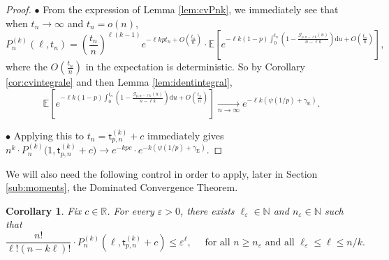 \documentclass[a4, 11pt]{article}
\numberwithin{equation}{section}
\theoremstyle{plain}
\newtheorem{corollary}[theorem]{Corollary}
\theoremstyle{definition}
\theoremstyle{remark}
\begin{document}
\begin{proof} $\bullet$ From the expression of Lemma \ref{lem:cvPnk}, we immediately see that when $t_n \rightarrow \infty$ and $t_n=o(n)$,
$$
P^{(k)}_n(\ell,t_n)=\left( \frac{t_n}{n}\right)^{\ell(k-1)}e^{-\ell kpt_n+O\left(\frac{t_n}{n}\right)} \cdot \mathbb E \left[e^{-\ell k (1-p) \int_0^{t_n} \left(1-\frac{\mathcal G_{p,n-\ell k}(u)}{n- \ell k} \right) \mathrm du+O\left(\frac{t_n}{n}\right) }\right],
$$
where the $O\left(\frac{t_n}{n}\right)$ in the expectation is deterministic. 
So by Corollary \ref{cor:cvintegrale} and then Lemma \ref{lem:identintegral},
$$
\mathbb E \left[e^{-\ell k (1-p) \int_0^{t_n} \left(1-\frac{\mathcal G_{p,n-\ell k}(u)}{n- \ell k} \right) \mathrm du+O\left(\frac{t_n}{n}\right) }\right] \underset{n \rightarrow \infty} \longrightarrow e^{-\ell k\left(\psi(1/p)+\gamma_{\mathrm E}\right)}.
$$

$\bullet$ Applying this to $t_n=\mathsf t^{(k)}_{p,n}+c$ immediately gives $n^k \cdot P^{(k)}_n\big(1,\mathsf t^{(k)}_{p,n}+c\big)  \rightarrow e^{-kpc} \cdot e^{-k\left(\psi(1/p)+\gamma_{\mathrm E}\right)}$.
\end{proof}

\bigskip

We will also need the following control in order to apply, later in Section \ref{sub:moments}, the Dominated Convergence Theorem.

\begin{corollary}
\label{cor:TCD1}
Fix $c \in \mathbb R$.
For every $\varepsilon>0$, there exists $\ell_{\varepsilon} \in \mathbb N$ and $n_{\varepsilon} \in \mathbb N$ such that
$$
\frac{n!}{\ell ! (n-k\ell)!} \cdot P_n^{(k)}(\ell,\mathsf t^{(k)}_{p,n}+c)  \leq \varepsilon^{\ell}, \quad \text{ for all }  n \geq n_{\varepsilon} \text{ and all } \ell_{\varepsilon} \leq \ell \leq n/k.
$$
\end{corollary}
\end{document}
